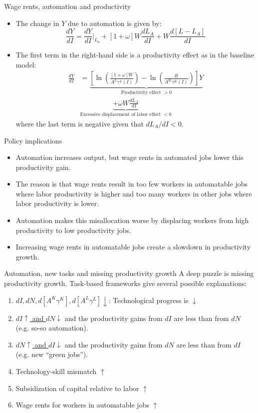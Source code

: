 \documentclass[notes=show]{beamer}
\begin{document}
\begin{frame}{Wage rents, automation and productivity}
\begin{itemize}
\item The change in $Y$ due to automation is given by:
\[
\frac{dY}{dI} = \frac{dY}{dI} |_{L_{a}} + [1+ \omega]W\frac{dL_{A}}{dI} +W\frac{d[L-L_{A}]}{dI}
\]
\item The first term in the right-hand side is a productivity effect as in the baseline model:
\begin{align*}
\frac{dY}{dI} & = \underbrace{\left[ \ln \left( \frac{[1+ \omega]W}{A^{L}\gamma^{L}(I)} \right) - \ln \left( \frac{R}{A^{K}\gamma^{K}(I)} \right) \right]Y}_{\text{Productivity effect }>0} \\
& \underbrace{ +\omega W \frac{dL_{A}}{dI}}_{\text{Excessive displacement of labor effect } <0}
\end{align*}
where the last term is negative given that $dL_{A}/dI <0$.
\end{itemize}
\end{frame}

\begin{frame}{Policy implications}
\begin{itemize}
\item Automation increases output, but wage rents in automated jobs lower this productivity gain. \medskip
\item The reason is that wage rents result in too few workers in automatable jobs where labor productivity is higher and too many workers in other jobs where labor productivity is lower. \medskip
\item Automation makes this misallocation worse by displacing workers from high productivity to low productivity jobs. \medskip
\item Increasing wage rents in automatable jobs create a slowdown in productivity growth.
\end{itemize}
\end{frame}

\begin{frame}{Automation, new tasks and missing productivity growth}
A deep puzzle is missing productivity growth. Task-based frameworks give several possible explanations: \medskip
\begin{enumerate}
\item \underline{$dI, dN, d[A^{K}\gamma^{K}],d[A^{L}\gamma^{L}] \downarrow$}: Technological progress is $\downarrow$ \medskip
\item \underline{$dI \uparrow$ and $dN \downarrow$} and the productivity gains from $dI$ are less than from $dN$ (e.g. so-so automation). \medskip
\item \underline{$dN \uparrow$ and $dI \downarrow$} and the productivity gains from $dN$ are less than from $dI$ (e.g. new ``green jobs''). \medskip
\item Technology-skill mismatch $ \uparrow$ \medskip
\item Subsidization of capital relative to labor $ \uparrow$ \medskip
\item Wage rents for workers in automatable jobs $ \uparrow$
\end{enumerate}
\end{frame}
\end{document}
